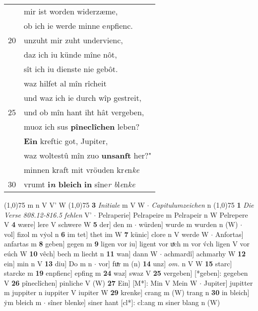 \documentclass[8pt,a4paper,notitlepage]{article}
\begin{document}
\begin{table}[ht]
\begin{minipage}[t]{0.5\linewidth}
\begin{tabular}{rl}
 & mir ist worden widerzæme,\\ 
 & ob ich ie werde minne e\textit{n}pfienc.\\ 
20 & unzuht mir zuht undervienc,\\ 
 & daz ich iu künde mîne nôt,\\ 
 & sît ich iu dienste nie gebôt.\\ 
 & waz hilfet al mîn rîcheit\\ 
 & und waz ich ie durch wîp gestreit,\\ 
25 & und ob mîn hant iht hât vergeben,\\ 
 & muoz ich sus \textbf{pîneclîchen} leben?\\ 
 & \textbf{Ein} kreftic got, Jupiter,\\ 
 & waz woltestû mîn zuo \textbf{unsanft} her?"\\ 
 & minnen kraft mit vröuden kr\textit{e}n\textit{ke}\\ 
30 & vrumt \textbf{i\textit{n} bleich} \textbf{in} sîne\textit{r b}l\textit{e}n\textit{ke}\\ 
\end{tabular}
\scriptsize
\line(1,0){75} \newline
m n V V' W \newline
\line(1,0){75} \newline
\textbf{3} \textit{Initiale} m V W   $\cdot$ \textit{Capitulumzeichen} n  \newline
\line(1,0){75} \newline
\textbf{1} \textit{Die Verse 808.12-816.5 fehlen} V'   $\cdot$ Pelraperie] Pelrapeire m Pelrapeir n W Pelrepere V \textbf{4} wære] lere V schwere W \textbf{5} der] den m  $\cdot$ würden] wurde m wurden n (W)  $\cdot$ vol] fizol m vẏol n \textbf{6} im tet] thet im W \textbf{7} künic] clore n V werde W  $\cdot$ Anfortas] anfartas m \textbf{8} geben] gegen m \textbf{9} ligen vor iu] ligent vor uͯch m vor v́ch ligen V vor eúch W \textbf{10} vêch] bech m liecht n \textbf{11} wan] dann W  $\cdot$ achmardî] achmarhy W \textbf{12} ein] min n V \textbf{13} diu] Do m n  $\cdot$ vor] fuͯr m (n) \textbf{14} unz] \textit{om.} n V W \textbf{15} starc] starcke m \textbf{19} enpfienc] epfing m \textbf{24} waz] swaz V \textbf{25} vergeben] [*geben]: gegeben V \textbf{26} pîneclîchen] pinliche V (W) \textbf{27} Ein] [M*]: Min V Mein W  $\cdot$ Jupiter] jupitter m juppiter n iuppiter V iupiter W \textbf{29} krenke] crang m (W) trang n \textbf{30} in bleich] ẏm bleich m  $\cdot$ sîner blenke] siner hant [cl*]: cl:ang m siner blang n (W) \newline
\end{minipage}
\end{table}
\end{document}
